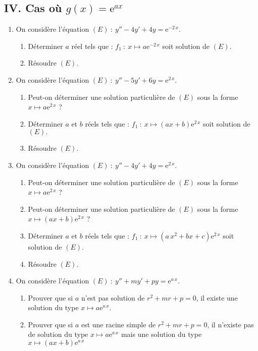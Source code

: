 \documentclass[12pt]{article}
\begin{document}
\subsection*{IV. Cas où \(g(x)=\mathrm{e}^{a x}\)}
\begin{enumerate}
    \item On considère l'équation \((E)\ :\ y''-4y'+4y=\mathrm{e}^{-2\,x}.\)
    \begin{enumerate}
        \item Déterminer \(a\) réel tels que :
        \(f_{1}\ :\ x\mapsto a\mathrm{e}^{-2\,x}\) soit solution de \((E).\) 
        \item Résoudre \((E).\) 
    \end{enumerate}
    \item On considère l'équation \((E)\ :\ y''-5y'+6y=\mathrm{e}^{2\,x}.\)
    \begin{enumerate}
        \item Peut-on déterminer une solution particulière de \((E)\) sous la forme \(x\mapsto a\mathrm{e}^{2\,x}\) ?
        \item Déterminer \(a\) et \(b\) réels tels que :
        \(f_{1}\ :\ x\mapsto(ax+b)\mathrm{e}^{2\,x}\) soit solution de \((E).\) 
        \item Résoudre \((E).\) 
    \end{enumerate}
    \item On considère l'équation \((E)\ :\ y''-4y'+4y=\mathrm{e}^{2\,x}.\)
    \begin{enumerate}
        \item Peut-on déterminer une solution particulière de \((E)\) sous la forme \(x\mapsto a\mathrm{e}^{2\,x}\) ?
        \item Peut-on déterminer une solution particulière de \((E)\) sous la forme \(x\mapsto (ax+b)\mathrm{e}^{2\,x}\) ?
        \item Déterminer \(a\text{ et }b\) réels tels que :
        \(f_{1}\ :\ x\mapsto(a\,x^{2}+bx+c)\mathrm{e}^{2\,x}\) soit solution de \((E).\) 
        \item Résoudre \((E).\) 
    \end{enumerate}
    \item On considère l'équation \((E)\ :\ y''+m y'+p y=\mathrm{e}^{a\,x}.\)
    \begin{enumerate}
        \item Prouver que si \(a\) n'est pas solution de \(r^{2}+m r+p=0\), il existe une solution du type \(x\mapsto a\mathrm{e}^{a\,x}.\)
        \item Prouver que si \(a\) est une racine simple de \(r^{2}+m r+p=0\), il n'existe pas de solution du type \(x\mapsto a\mathrm{e}^{a\,x}\) mais une solution du type \(x\mapsto(ax+b)\mathrm{e}^{a\,x}\)

\end{enumerate}
\end{enumerate}
\end{document}
